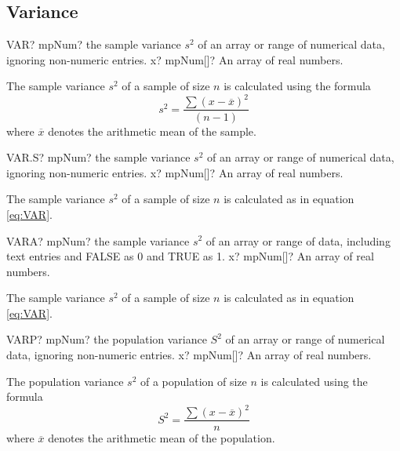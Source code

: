 \subsection{Variance}


\begin{mpFunctionsExtract}
	\mpWorksheetFunctionOneNotImplemented
	{VAR? mpNum? the sample variance $s^2$ of an array or range of numerical data, ignoring non-numeric entries.}
	{x? mpNum[]? An array of real numbers.}
\end{mpFunctionsExtract}

The sample variance $s^2$ of a sample of size $n$ is calculated using the formula
\begin{equation} \label{eq:VAR}
	s^2 = \frac{\sum (x-\overline{x})^2}{(n-1)} 
\end{equation}
where $\overline{x}$ denotes the arithmetic mean of the sample.



\vspace{0.6cm}
\begin{mpFunctionsExtract}
	\mpWorksheetFunctionOneNotImplemented
	{VAR.S? mpNum? the sample variance $s^2$ of an array or range of numerical data, ignoring non-numeric entries.}
	{x? mpNum[]? An array of real numbers.}
\end{mpFunctionsExtract}

The sample variance $s^2$ of a sample of size $n$ is calculated as in equation \ref{eq:VAR}.



\vspace{0.6cm}
\begin{mpFunctionsExtract}
	\mpWorksheetFunctionOneNotImplemented
	{VARA? mpNum? the sample variance $s^2$ of an array or range of data, including text entries and FALSE as 0 and TRUE as 1.}
	{x? mpNum[]? An array of real numbers.}
\end{mpFunctionsExtract}

The sample variance $s^2$ of a sample of size $n$ is calculated as in equation \ref{eq:VAR}.


\vspace{0.6cm}
\begin{mpFunctionsExtract}
	\mpWorksheetFunctionOneNotImplemented
	{VARP? mpNum? the population variance $S^2$ of an array or range of numerical data, ignoring non-numeric entries.}
	{x? mpNum[]? An array of real numbers.}
\end{mpFunctionsExtract}

The population variance $s^2$ of a population of size $n$ is calculated using the formula
\begin{equation}  \label{eq:VARP}
	S^2 = \frac{\sum (x-\overline{x})^2}{n} 
\end{equation}
where $\overline{x}$ denotes the arithmetic mean of the population.




